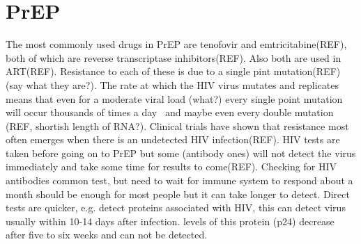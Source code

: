 \documentclass[DIV=15]{scrartcl}
\begin{document}
\iffalse
stuff about different models mostly seem to be compartmental and findings i.e. not much resitance also in keeping wwith some experiments but long term what will this do and also non-adherance and undetecable infection increase risk. Here the dynamics with the host are also considered as have not been so much before, in particular the presence of  latent reservoir  can increase the aount of time resiaetane t strains can stay in the body. there also is the possiblity of preferential transmission of founder strains.

\subsection{What is the question?}
prep big thing, models show that not not much cause for concern in this generating more resistance. But not account for the within host dynamics, so look at that with model here. areas of not much understand competition in recipient and what transmitted e.g. reservoir in GT. 

show that reservoir can increase timestrain stays in body and also inreservoir. metric here is frequency

\fi


\section{PrEP}
The most commonly used  drugs in PrEP  are tenofovir and emtricitabine(REF), both of which are reverse transcriptase inhibitors(REF).  Also both are used in ART(REF). Resistance to each of these  is due to a single pint mutation(REF)(say what they are?). The rate at which the HIV virus mutates and replicates means that even for a moderate viral load (what?) every single point mutation will occur thousands of times a day~\cite{coffin1995} and maybe even every double mutation (REF, shortish length of RNA?). Clinical trials have shown that resistance most often emerges when there is an undetected HIV infection(REF). HIV tests are taken before going on to PrEP but some (antibody ones) will not detect the virus immediately and take some time for results to come(REF). Checking for HIV antibodies common test, but need to wait for immune system to respond about a month should be enough for most people but it can take longer to detect. Direct tests are quicker, e.g. detect proteins associated with HIV, this can detect virus usually within 10-14 days after infection. levels of this protein (p24) decrease after five to six weeks and can not be detected. 
\end{document}
